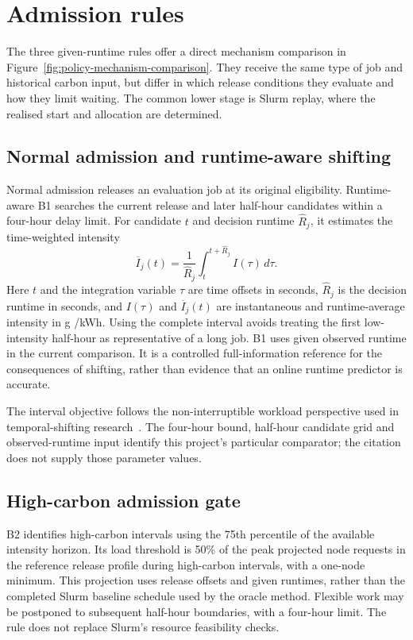 \section{Admission rules}
The three given-runtime rules offer a direct mechanism comparison in Figure~\ref{fig:policy-mechanism-comparison}. They receive the same type of job and historical carbon input, but differ in which release conditions they evaluate and how they limit waiting. The common lower stage is Slurm replay, where the realised start and allocation are determined.

\FloatBarrier

\subsection{Normal admission and runtime-aware shifting}
Normal admission releases an evaluation job at its original eligibility. Runtime-aware B1 searches the current release and later half-hour candidates within a four-hour delay limit. For candidate $t$ and decision runtime $\widehat R_j$, it estimates the time-weighted intensity
\begin{equation}
\overline I_j(t)=\frac{1}{\widehat R_j}
\int_t^{t+\widehat R_j} I(\tau)\,d\tau.
\end{equation}
Here $t$ and the integration variable $\tau$ are time offsets in seconds, $\widehat R_j$ is the decision runtime in seconds, and $I(\tau)$ and $\overline I_j(t)$ are instantaneous and runtime-average intensity in g \co/kWh. Using the complete interval avoids treating the first low-intensity half-hour as representative of a long job. B1 uses given observed runtime in the current comparison. It is a controlled full-information reference for the consequences of shifting, rather than evidence that an online runtime predictor is accurate.

The interval objective follows the non-interruptible workload perspective used in temporal-shifting research~\cite{wiesner2021wait}. The four-hour bound, half-hour candidate grid and observed-runtime input identify this project's particular comparator; the citation does not supply those parameter values.

\subsection{High-carbon admission gate}
B2 identifies high-carbon intervals using the 75th percentile of the available intensity horizon. Its load threshold is 50\% of the peak projected node requests in the reference release profile during high-carbon intervals, with a one-node minimum. This projection uses release offsets and given runtimes, rather than the completed Slurm baseline schedule used by the oracle method. Flexible work may be postponed to subsequent half-hour boundaries, with a four-hour limit. The rule does not replace Slurm's resource feasibility checks.

